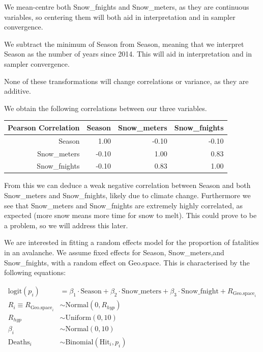 \documentclass[12pt]{extarticle}
\begin{document}
We mean-centre both Snow\_fnights and Snow\_meters, as they are continuous variables, so centering them will both aid in interpretation and in sampler convergence. 

We subtract the minimum of Season from Season, meaning that we interpret Season as the number of years since 2014. This will aid in interpretation and in sampler convergence. 

None of these transformations will change correlations or variance, as they are additive. 

We obtain the following correlations between our three variables. 
\begin{table}[ht]
	\centering
	\begin{tabular}{r|rrr}
	Pearson Correlation	& Season & Snow\_meters & Snow\_fnights \\ 
		\hline
		Season & 1.00 & -0.10 & -0.10 \\ 
		Snow\_meters & -0.10 & 1.00 & 0.83 \\ 
		Snow\_fnights & -0.10 & 0.83 & 1.00 \\ 
	\end{tabular}
\end{table}

From this we can deduce a weak negative correlation between Season and both Snow\_meters and Snow\_fnights, likely due to climate change. Furthermore we see that Snow\_meters and Snow\_fnights are extremely highly correlated, as expected (more snow means more time for snow to melt). This could prove to be a problem, so we will address this later. 

We are interested in fitting a random effects model for the proportion of fatalities in an avalanche. We assume fixed effects for Season, Snow\_meters,and Snow\_fnights, with a random effect on Geo.space. This is characterised by the following equations:

\begin{align*}
\mathrm{logit}(p_i) &= \beta_1 \cdot \mathrm{Season} + \beta_2 \cdot \mathrm{Snow\_meters} + \beta_3 \cdot \mathrm{Snow\_fnight} + R_{\mathrm{Geo.space}_i}\\
R_i \equiv R_{\mathrm{Geo.space}_i} &\sim \mathrm{Normal}(0, R_{hyp})\\
R_{hyp} &\sim \mathrm{Uniform}(0, 10)\\
\beta_i &\sim \mathrm{Normal}(0, 10)\\
\mathrm{Deaths}_i &\sim \mathrm{Binomial}(\mathrm{Hit}_i, p_i)
\end{align*}
\end{document}

